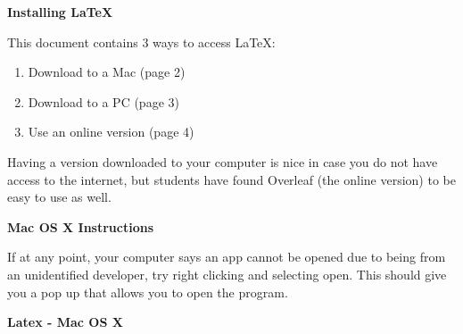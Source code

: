 \documentclass[a4paper,12pt]{letter}
\begin{document}


\begin{center}
{\bf Installing \LaTeX}

\vspace{-2mm}

\end{center}


This document contains 3 ways to access \LaTeX:
	\begin{enumerate}
	\item Download to a Mac (page 2)
	\item Download to a PC (page 3)
	\item Use an online version (page 4)
	\end{enumerate}

Having a version downloaded to your computer is nice in case you do not have access to the internet, but students have found Overleaf (the online version) to be easy to use as well.

\newpage

\begin{center}
{\bf Mac OS X Instructions}
\end{center}

If at any point, your computer says an app cannot be opened due to being from an unidentified developer, try right clicking and selecting open.  This should give you a pop up that allows you to open the program.


\begin{center}
{\bf Latex - Mac OS X}
\end{center}
\end{document}

